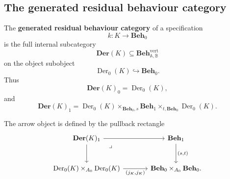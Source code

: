 \subsection{The generated residual behaviour category}
\label{subsec:generated-residual-behaviour-category}

\begin{definition}
\label{def:generated-residual-behaviour-category}
    The \textbf{generated residual behaviour category} of a specification
    \[
        k:K\to\mathbf{Beh}_0
    \]
    is the full internal subcategory
    \[
        \mathbf{Der}(K)
        \subseteq
        \mathbf{Beh}^{\mathrm{vert}}_{\mathbb A,\mathbb B}
    \]
    on the object subobject
    \[
        \operatorname{Der}_0(K)\hookrightarrow\mathbf{Beh}_0.
    \]
    Thus
    \[
        \mathbf{Der}(K)_0=\operatorname{Der}_0(K),
    \]
    and
    \[
        \mathbf{Der}(K)_1
        =
        \operatorname{Der}_0(K)
        \times_{\mathbf{Beh}_0,s}
        \mathbf{Beh}_1
        \times_{t,\mathbf{Beh}_0}
        \operatorname{Der}_0(K).
    \]
\end{definition}

The arrow object is defined by the pullback rectangle
\[
    \begin{tikzcd}[column sep=large, row sep=large]
            \mathbf{Der}(K)_1
                \arrow[r]
                \arrow[d]
                \arrow[dr, phantom, "\lrcorner", very near start]
        &
            \mathbf{Beh}_1
                \arrow[d, "{(s,t)}"]
        \\
            \operatorname{Der}_0(K)\times_{A_0}\operatorname{Der}_0(K)
                \arrow[r, "{(j_K,j_K)}"']
        &
            \mathbf{Beh}_0\times_{A_0}\mathbf{Beh}_0.
    \end{tikzcd}
\]

